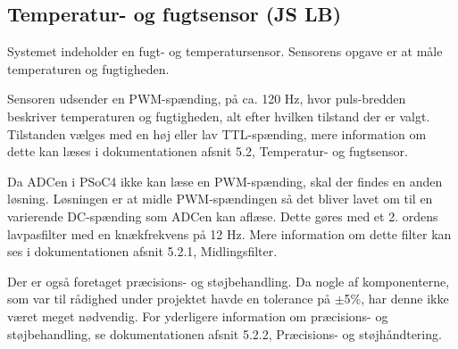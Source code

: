\subsection{Temperatur- og fugtsensor (JS LB)}


Systemet indeholder en fugt- og temperatursensor. Sensorens opgave er at måle temperaturen og fugtigheden.

Sensoren udsender en PWM-spænding, på ca. 120 Hz, hvor puls-bredden beskriver temperaturen og fugtigheden, alt efter hvilken tilstand der er valgt. Tilstanden vælges med en høj eller lav TTL-spænding, mere information om dette kan læses i dokumentationen afsnit 5.2, Temperatur- og fugtsensor.

Da ADCen i PSoC4 ikke kan læse en PWM-spænding, skal der findes en anden løsning. Løsningen er at midle PWM-spændingen så det bliver lavet om til en varierende DC-spænding som ADCen kan aflæse. Dette gøres med et 2. ordens lavpasfilter med en knækfrekvens på 12 Hz. Mere information om dette filter kan ses i dokumentationen afsnit 5.2.1, Midlingsfilter.
 
Der er også foretaget præcisions- og støjbehandling. Da nogle af komponenterne, som var til rådighed under projektet havde en tolerance på $\pm$5\%, har denne ikke været meget nødvendig. For yderligere information om præcisions- og støjbehandling, se dokumentationen afsnit 5.2.2, Præcisions- og støjhåndtering. 